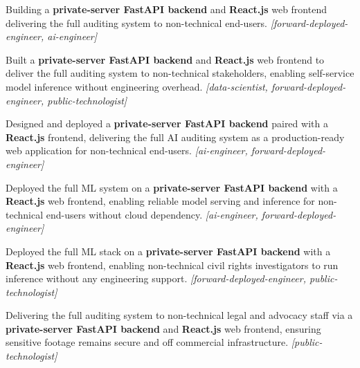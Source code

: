 \documentclass[letterpaper,11pt]{article}
\newcommand{\resumeItem}[1]{
  \item\small{
    {#1 \vspace{-3pt}}
  }
}
\begin{document}
                \resumeItem{Building a \textbf{private-server FastAPI backend} and \textbf{React.js} web frontend delivering the full auditing system to non-technical end-users. \textit{[forward-deployed-engineer, ai-engineer]}}
                \resumeItem{Built a \textbf{private-server FastAPI backend} and \textbf{React.js} web frontend to deliver the full auditing system to non-technical stakeholders, enabling self-service model inference without engineering overhead. \textit{[data-scientist, forward-deployed-engineer, public-technologist]}}
                \resumeItem{Designed and deployed a \textbf{private-server FastAPI backend} paired with a \textbf{React.js} frontend, delivering the full AI auditing system as a production-ready web application for non-technical end-users. \textit{[ai-engineer, forward-deployed-engineer]}}
                \resumeItem{Deployed the full ML system on a \textbf{private-server FastAPI backend} with a \textbf{React.js} web frontend, enabling reliable model serving and inference for non-technical end-users without cloud dependency. \textit{[ai-engineer, forward-deployed-engineer]}}
                \resumeItem{Deployed the full ML stack on a \textbf{private-server FastAPI backend} with a \textbf{React.js} web frontend, enabling non-technical civil rights investigators to run inference without any engineering support. \textit{[forward-deployed-engineer, public-technologist]}}
                \resumeItem{Delivering the full auditing system to non-technical legal and advocacy staff via a \textbf{private-server FastAPI backend} and \textbf{React.js} web frontend, ensuring sensitive footage remains secure and off commercial infrastructure. \textit{[public-technologist]}}
\end{document}
